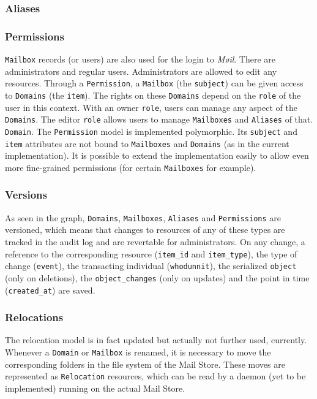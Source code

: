 \documentclass[12pt,a4paper]{scrartcl}
\begin{document}
			\subsubsection*{Aliases}

			\subsubsection*{Permissions}
				\texttt{Mailbox} records (or users) are also used for the login
				to \emph{Møil}. There are administrators and regular users.
				Administrators are allowed to edit any resources. Through a
				\texttt{Permission}, a \texttt{Mailbox} (the \texttt{subject})
				can be given access to \texttt{Domains} (the \texttt{item}).
				The rights on these \texttt{Domains} depend on the
				\texttt{role} of the user in this context. With an owner
				\texttt{role}, users can manage any aspect of the
				\texttt{Domains}. The editor \texttt{role} allows users to
				manage \texttt{Mailboxes} and \texttt{Aliases} of that.
				\texttt{Domain}. The \texttt{Permission} model is implemented
				polymorphic. Its \texttt{subject} and \texttt{item} attributes
				are not bound to \texttt{Mailboxes} and \texttt{Domains} (as in
				the current implementation). It is possible to extend the
				implementation easily to allow even more fine-grained
				permissions (for certain \texttt{Mailboxes} for example).

			\subsubsection*{Versions}
				As seen in the graph, \texttt{Domains}, \texttt{Mailboxes},
				\texttt{Aliases} and \texttt{Permissions} are versioned, which
				means that changes to resources of any of these types are
				tracked in the audit log and are revertable for administrators.
				On any change, a reference to the corresponding resource
				(\texttt{item\_id} and \texttt{item\_type}), the type of change
				(\texttt{event}), the transacting individual
				(\texttt{whodunnit}), the serialized \texttt{object} (only on
				deletions), the \texttt{object\_changes} (only on updates) and
				the point in time (\texttt{created\_at}) are saved.

			\subsubsection*{Relocations}
				The relocation model is in fact updated but actually not
				further used, currently. Whenever a \texttt{Domain} or
				\texttt{Mailbox} is renamed, it is necessary to move the
				corresponding folders in the file system of the Mail Store.
				These moves are represented as \texttt{Relocation} resources,
				which can be read by a daemon (yet to be implemented) running
				on the actual Mail Store.
\end{document}
